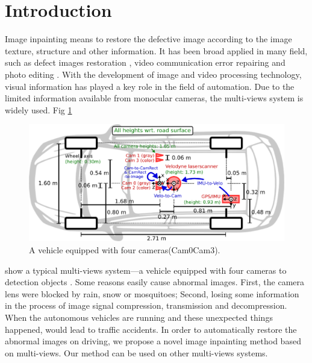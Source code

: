 \documentclass{IEEE_lsens}
\begin{document}
\maketitle

\section{Introduction}

Image inpainting means to restore the defective image according to the image texture, structure and other information. It has been broad applied in many field, such as defect images restoration  \cite{Efros1999::Texture,Lu2010::Novel}, video communication error repairing \cite{Rane2002::Wavelet,Rane2003:IToIP:Structure} and photo editing \cite{Bertalmio2000::Image,Shih2005::Digital}. With the development of image and video processing technology, visual information has played a key role in the field  of automation. Due to the limited information available from monocular cameras, the multi-views system is widely used. Fig \ref{fig:VehicleWithFourCameras} 
\begin{figure}[!t]
\centering
\includegraphics[width=6.0in]{self_driver_top_view}
\caption{A vehicle equipped with four cameras(Cam0\texttildelow Cam3).}
\label{fig:VehicleWithFourCameras}
\end{figure}
show a typical multi-views system---a vehicle equipped with four cameras to detection objects \cite{Geiger2012::Are}. Some reasons easily cause abnormal images. First, the camera lens were blocked by rain, snow or mosquitoes; Second, losing some information in the process of image signal compression, transmission and decompression. When the autonomous vehicles are running and these unexpected things happened, would lead to traffic accidents. In order to automatically restore the abnormal images on driving, we propose a novel image inpainting method based on multi-views. Our method can be used on other multi-views systems.
\end{document}
